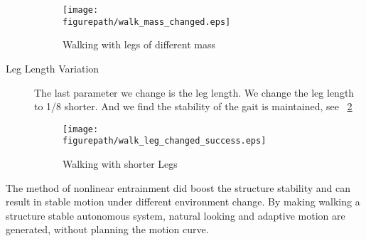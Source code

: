 \begin{description}
\begin{figure}[here]
\centering
\texttt{[image: \\figurepath/walk\_mass\_changed.eps]}
\label{fig:walk_mass_changed}
\caption
{
Walking with legs of different mass
}
\label{fig:leg mass}
\end{figure}

\item[Leg Length Variation]
The last parameter we change is the leg length. 
We change the leg length to 1/8 shorter. 
And we find the stability of the gait is maintained, see \figurename ~\ref{fig:walk_leg_changed}

\begin{figure}[h]
\centering
\texttt{[image: \\figurepath/walk\_leg\_changed\_success.eps]}
\caption
{
Walking with shorter Legs
}
\label{fig:walk_leg_changed}
\end{figure}
\end{description}

The method of nonlinear entrainment did boost the structure stability and can result in stable motion under different environment change.
By making walking a structure stable autonomous system, natural looking and adaptive motion are generated, without planning the motion curve.
